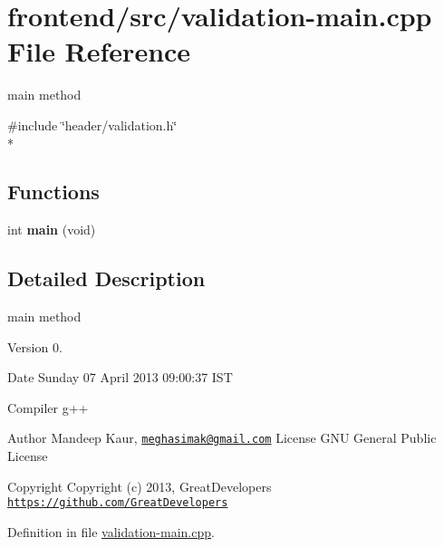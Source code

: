 \hypertarget{validation-main_8cpp}{\section{frontend/src/validation-\/main.cpp File Reference}
\label{validation-main_8cpp}
}


main method  


{\ttfamily \#include \char`\"{}header/validation.\-h\char`\"{}}\\*
\subsection*{Functions}
\begin{DoxyCompactItemize}
\item 
\hypertarget{validation-main_8cpp_a840291bc02cba5474a4cb46a9b9566fe}{int {\bfseries main} (void)}\label{validation-main_8cpp_a840291bc02cba5474a4cb46a9b9566fe}

\end{DoxyCompactItemize}


\subsection{Detailed Description}
main method \begin{DoxyVersion}{Version}
0. 
\end{DoxyVersion}
\begin{DoxyDate}{Date}
Sunday 07 April 2013 09\-:00\-:37 I\-S\-T\par
 Compiler g++
\end{DoxyDate}
\begin{DoxyAuthor}{Author}
Mandeep Kaur, \href{mailto:meghasimak@gmail.com}{\tt meghasimak@gmail.\-com} License G\-N\-U General Public License 
\end{DoxyAuthor}
\begin{DoxyCopyright}{Copyright}
Copyright (c) 2013, Great\-Developers \href{https://github.com/GreatDevelopers}{\tt https\-://github.\-com/\-Great\-Developers} 
\end{DoxyCopyright}


Definition in file \hyperlink{validation-main_8cpp_source}{validation-\/main.\-cpp}.

